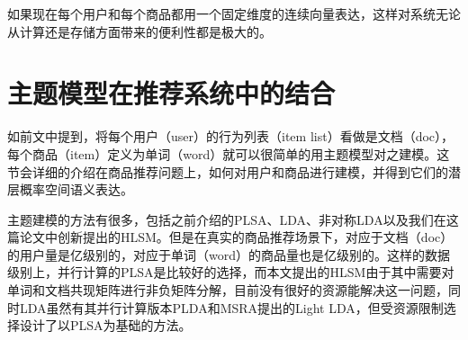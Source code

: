 如果现在每个用户和每个商品都用一个固定维度的连续向量表达，这样对系统无论从计算还是存储方面带来的便利性都是极大的。
\section{主题模型在推荐系统中的结合}
如前文中提到，将每个用户（user）的行为列表（item list）看做是文档（doc），每个商品（item）定义为单词（word）就可以很简单的用主题模型对之建模。这节会详细的介绍在商品推荐问题上，如何对用户和商品进行建模，并得到它们的潜层概率空间语义表达。

主题建模的方法有很多，包括之前介绍的PLSA、LDA、非对称LDA以及我们在这篇论文中创新提出的HLSM。但是在真实的商品推荐场景下，对应于文档（doc）的用户量是亿级别的，对应于单词（word）的商品量也是亿级别的。这样的数据级别上，并行计算的PLSA是比较好的选择，而本文提出的HLSM由于其中需要对单词和文档共现矩阵进行非负矩阵分解，目前没有很好的资源能解决这一问题，同时LDA虽然有其并行计算版本PLDA\cite{PLDA}和MSRA提出的Light LDA\cite{lightLDA}，但受资源限制选择设计了以PLSA为基础的方法。

